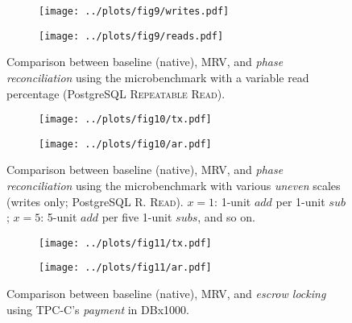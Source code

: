 \documentclass[border=2cm]{standalone}
\begin{document}
\begin{minipage}{17cm}
\vspace{1cm}

\begin{figure}[h]
	\centering
	\begin{subfigure}{.35\linewidth}
		\centering
		\texttt{[image: ../plots/fig9/writes.pdf]}
	\end{subfigure}
	\hspace*{0.2cm}
	\begin{subfigure}{.35\linewidth}
		\centering
		\texttt{[image: ../plots/fig9/reads.pdf]}
	\end{subfigure}
	\caption{Comparison between baseline (native), MRV, and \textit{phase reconciliation} using the microbenchmark with a variable read percentage (PostgreSQL \textsc{Repeatable Read}).}
\end{figure}

\vspace{1cm}

\begin{figure}[h]
	\centering
	\begin{subfigure}{.35\linewidth}
		\centering
		\texttt{[image: ../plots/fig10/tx.pdf]}
	\end{subfigure}
	\hspace*{0.2cm}
	\begin{subfigure}{.35\linewidth}
		\centering
		\texttt{[image: ../plots/fig10/ar.pdf]}
	\end{subfigure}
	\caption{Comparison between baseline (native), MRV, and \textit{phase reconciliation} using the microbenchmark with various \textit{uneven} scales (writes only; PostgreSQL \textsc{R. Read}).
	\normalfont \small $x=1$: 1-unit $add$ per 1-unit $sub$; $x=5$: 5-unit $add$ per five 1-unit $subs$, and so on.}
\end{figure}

\vspace{1cm}

\begin{figure}[h]
	\centering
	\begin{subfigure}{.35\linewidth}
		\centering
		\texttt{[image: ../plots/fig11/tx.pdf]}
	\end{subfigure}
	\hspace*{0.2cm}
	\begin{subfigure}{.35\linewidth}
		\centering
		\texttt{[image: ../plots/fig11/ar.pdf]}
	\end{subfigure}
	\caption{Comparison between baseline (native), MRV, and \textit{escrow locking} using TPC-C's \textit{payment} in DBx1000.}
\end{figure}


\end{minipage}
\end{document}
